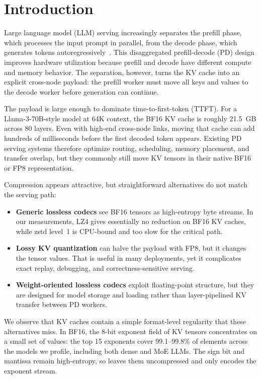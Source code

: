 \section{Introduction}
\label{sec:intro}

Large language model (LLM) serving increasingly separates the prefill phase, which processes the input prompt in parallel, from the decode phase, which generates tokens autoregressively~\cite{distserve,splitwise,mooncake}. This disaggregated prefill-decode (PD) design improves hardware utilization because prefill and decode have different compute and memory behavior. The separation, however, turns the KV cache into an explicit cross-node payload: the prefill worker must move all keys and values to the decode worker before generation can continue.

The payload is large enough to dominate time-to-first-token (TTFT). For a Llama-3-70B-style model at 64K context, the BF16 KV cache is roughly 21.5~GB across 80 layers. Even with high-end cross-node links, moving that cache can add hundreds of milliseconds before the first decoded token appears. Existing PD serving systems therefore optimize routing, scheduling, memory placement, and transfer overlap, but they commonly still move KV tensors in their native BF16 or FP8 representation.

Compression appears attractive, but straightforward alternatives do not match the serving path:

\begin{itemize}[nosep,leftmargin=*]
\item \textbf{Generic lossless codecs} see BF16 tensors as high-entropy byte streams. In our measurements, LZ4 gives essentially no reduction on BF16 KV caches, while zstd level~1 is CPU-bound and too slow for the critical path.
\item \textbf{Lossy KV quantization} can halve the payload with FP8, but it changes the tensor values. That is useful in many deployments, yet it complicates exact replay, debugging, and correctness-sensitive serving.
\item \textbf{Weight-oriented lossless codecs} exploit floating-point structure, but they are designed for model storage and loading rather than layer-pipelined KV transfer between PD workers.
\end{itemize}

We observe that KV caches contain a simple format-level regularity that these alternatives miss. In BF16, the 8-bit exponent field of KV tensors concentrates on a small set of values: the top 15 exponents cover 99.1--99.8\% of elements across the models we profile, including both dense and MoE LLMs. The sign bit and mantissa remain high-entropy, so \splitzip leaves them uncompressed and only encodes the exponent stream.

